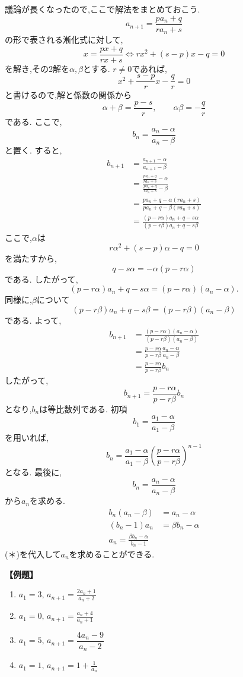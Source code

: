 議論が長くなったので,ここで解法をまとめておこう.
\[
  a_{n+1}=\frac{pa_n+q}{ra_n+s}
\]
の形で表される漸化式に対して,
\[
  x= \frac{px+q}{rx+s} \Leftrightarrow rx^2+(s-p)x-q=0
\]
を解き,その2解を$\alpha,\beta$とする.
$r\neq0$であれば,
\[
  x^2+\frac{s-p}{r}x-\frac qr=0
\]
と書けるので,解と係数の関係から
\[
  \alpha+\beta=\frac{p-s}{r},
  \qquad
  \alpha\beta=-\frac qr
\]
である.
ここで,
\[
  b_n=\frac{a_n-\alpha}{a_n-\beta}
\]
と置く.
すると,
\begin{align*}
  b_{n+1} & =\frac{a_{n+1}-\alpha}{a_{n+1}-\beta}                                                       \\
          & =\frac{\displaystyle\frac{pa_n+q}{ra_n+s}-\alpha}{\displaystyle\frac{pa_n+q}{ra_n+s}-\beta} \\
          & =\frac{pa_n+q-\alpha(ra_n+s)}{pa_n+q-\beta(ra_n+s)}                                         \\
          & =\frac{(p-r\alpha)a_n+q-s\alpha}{(p-r\beta)a_n+q-s\beta}
\end{align*}
ここで,$\alpha$は
\[
  r\alpha^2+(s-p)\alpha-q=0
\]
を満たすから,
\[
  q-s\alpha=-\alpha(p-r\alpha)
\]
である.
したがって,
\[
  (p-r\alpha)a_n+q-s\alpha
  =(p-r\alpha)(a_n-\alpha).
\]
同様に,$\beta$について
\[
  (p-r\beta)a_n+q-s\beta
  =(p-r\beta)(a_n-\beta)
\]
である.
よって,
\begin{align*}
  b_{n+1} & =\frac{(p-r\alpha)(a_n-\alpha)}{(p-r\beta)(a_n-\beta)}  \\
          & =\frac{p-r\alpha}{p-r\beta}\frac{a_n-\alpha}{a_n-\beta} \\
          & =\frac{p-r\alpha}{p-r\beta}b_n
\end{align*}
したがって,
\[
  b_{n+1}=\frac{p-r\alpha}{p-r\beta}b_n
\]
となり,$b_n$は等比数列である.
初項
\[
  b_1=\frac{a_1-\alpha}{a_1-\beta}
\]
を用いれば,
\[
  b_n=\frac{a_1-\alpha}{a_1-\beta}\left(\frac{p-r\alpha}{p-r\beta}\right)^{n-1} \tag{＊}
\]
となる.
最後に,
\[
  b_n=\frac{a_n-\alpha}{a_n-\beta}
\]
から$a_n$を求める.
\begin{align*}
  b_n(a_n-\beta) & =a_n-\alpha       \\
  (b_n-1)a_n     & =\beta b_n-\alpha \\
  a_n=\frac{\beta b_n-\alpha}{b_n-1}
\end{align*}
(＊)を代入して$a_n$を求めることができる.

\noindent \textbf{【例題】}
\begin{enumerate}[label=(\arabic*),parsep=3pt]
  \item $\displaystyle a_1=3,\, a_{n+1}=\frac{2a_n+1}{a_n+2}$
  \item $\displaystyle a_1=0,\, a_{n+1}=\frac{a_n+4}{a_n+1}$
  \item $\displaystyle a_1=5,\, a_{n+1}=\dfrac{4a_{n}-9}{a_{n}-2}$
  \item $\displaystyle a_1=1,\, a_{n+1}=1+\frac{1}{a_n}$
\end{enumerate}

